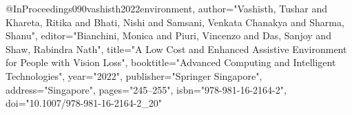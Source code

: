 @InProceedings{090vashisth2022environment,
author="Vashisth, Tushar
and Khareta, Ritika
and Bhati, Nishi
and Samsani, Venkata Chanakya
and Sharma, Shanu",
editor="Bianchini, Monica
and Piuri, Vincenzo
and Das, Sanjoy
and Shaw, Rabindra Nath",
title="A Low Cost and Enhanced Assistive Environment for People with Vision Loss",
booktitle="Advanced Computing and Intelligent Technologies",
year="2022",
publisher="Springer Singapore",
address="Singapore",
pages="245--255",
isbn="978-981-16-2164-2",
doi="10.1007/978-981-16-2164-2_20"
}